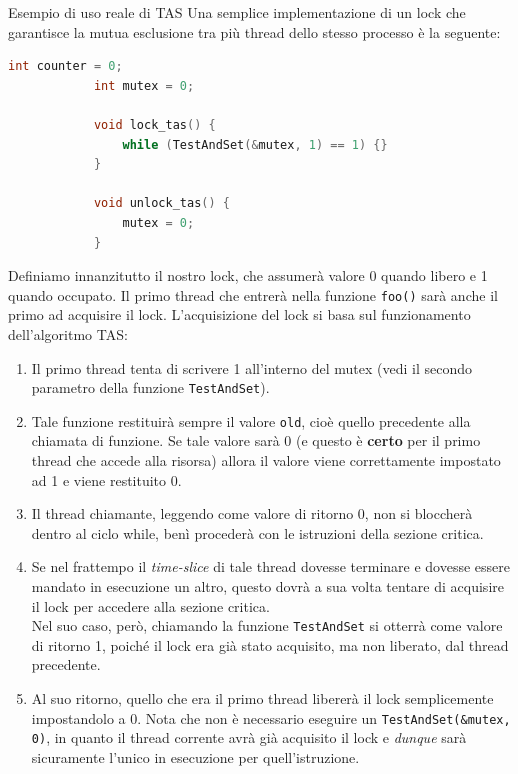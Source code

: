 \documentclass[12pt]{report}
\begin{document}
	\begin{esempio}{Esempio di uso reale di TAS}{}
		Una semplice implementazione di un lock che garantisce la mutua esclusione tra più thread dello stesso processo è la seguente:
		\begin{lstlisting}[language=C]
			int counter = 0;
			int mutex = 0;
			
			void lock_tas() {
				while (TestAndSet(&mutex, 1) == 1) {}
			}
			
			void unlock_tas() {
				mutex = 0;
			}			
		\end{lstlisting}
		Definiamo innanzitutto il nostro lock, che assumerà valore 0 quando libero e 1 quando occupato. Il primo thread che entrerà nella funzione \texttt{foo()} sarà anche il primo ad acquisire il lock. L'acquisizione del lock si basa sul funzionamento dell'algoritmo TAS:
		\begin{enumerate}
			\item Il primo thread tenta di scrivere 1 all'interno del mutex (vedi il secondo parametro della funzione \texttt{TestAndSet}).
			
			\item Tale funzione restituirà sempre il valore \texttt{old}, cioè quello precedente alla chiamata di funzione. Se tale valore sarà 0 (e questo è \textbf{certo} per il primo thread che accede alla risorsa) allora il valore viene correttamente impostato ad 1 e viene restituito 0.
			
			\item Il thread chiamante, leggendo come valore di ritorno 0, non si bloccherà dentro al ciclo while, benì procederà con le istruzioni della sezione critica.
			
			\item Se nel frattempo il \textit{time-slice} di tale thread dovesse terminare e dovesse essere mandato in esecuzione un altro, questo dovrà a sua volta tentare di acquisire il lock per accedere alla sezione critica.\\
			Nel suo caso, però, chiamando la funzione \texttt{TestAndSet} si otterrà come valore di ritorno 1, poiché il lock era già stato acquisito, ma non liberato, dal thread precedente.
			
			\item Al suo ritorno, quello che era il primo thread libererà il lock semplicemente impostandolo a 0. Nota che non è necessario eseguire un \texttt{TestAndSet(\&mutex, 0)}, in quanto il thread corrente avrà già acquisito il lock e \textit{dunque} sarà sicuramente l'unico in esecuzione per quell'istruzione.
		\end{enumerate}
	\end{esempio}
	
\end{document}

